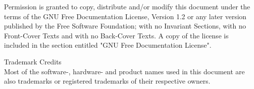 \small{Permission is granted to copy, distribute and/or modify this document
    under the terms of the GNU Free Documentation License, Version 1.2
    or any later version published by the Free Software Foundation;
    with no Invariant Sections, with no Front-Cover Texts and with no
    Back-Cover Texts. A copy of the license is included in the section
    entitled "GNU Free Documentation License".}

\small{Trademark Credits\\
    Most of the software-, hardware- and product names used in this document
    are also trademarks or registered trademarks of their respective owners.
}
